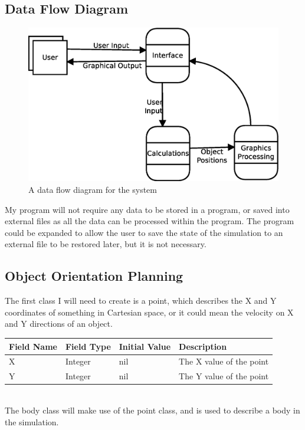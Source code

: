 \subsection{Data Flow Diagram}
\begin{figure}[h]
	\includegraphics[width=\textwidth]{./img/data-flow-diagram2.eps}
	\caption{A data flow diagram for the system}
	\label{fig:dfd}
\end{figure}
My program will not require any data to be stored in a program, or saved into
external files as all the data can be processed within the program. The program
could be expanded to allow the user to save the state of the simulation to an
external file to be restored later, but it is not necessary.

\subsection{Object Orientation Planning}
The first class I will need to create is a point, which describes the X and Y
coordinates of something in Cartesian space, or it could mean the velocity on X
and Y directions of an object. \\

\begin{tabularx}{\linewidth}{l | l | l | X}
	Field Name & Field Type & Initial Value & Description \\ \hline
	X & Integer & nil & The X value of the point \\
	Y & Integer & nil & The Y value of the point \\
\end{tabularx} \\

The body class will make use of the point class, and is used to describe a body
in the simulation. \\

